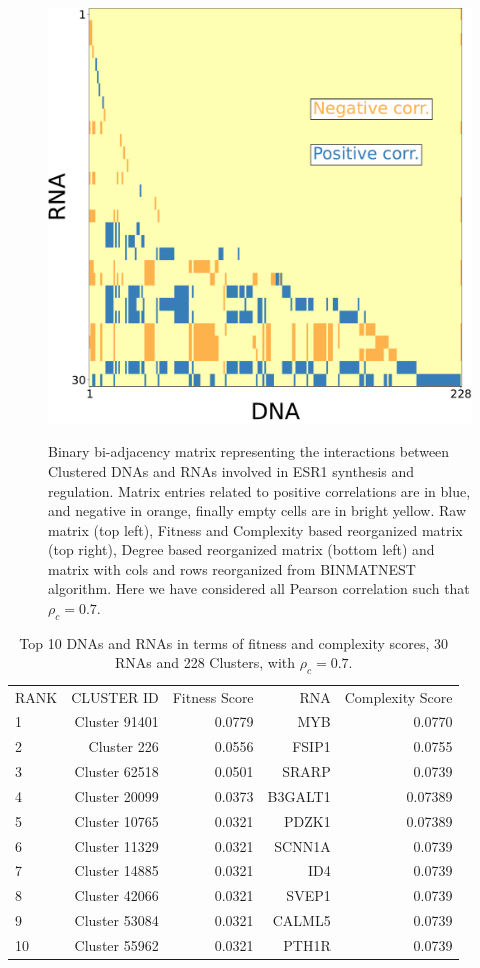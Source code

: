 \documentclass[10pt,a4paper]{article}
\begin{document}
\begin{figure}[h!]
\begin{center}
{\includegraphics[width=0.5\columnwidth]{FIG/ADN_c-ARN_BINMATNEST-ESR1-Matrix-sum-unit-0.7-PN.pdf}
}
\end{center}
\caption{\label{fig:fig1}Binary bi-adjacency matrix representing the interactions between Clustered DNAs and RNAs involved in ESR1 synthesis and regulation. Matrix entries related to positive correlations are in blue, and negative in orange, finally empty cells are in bright yellow. Raw matrix (top left), Fitness and Complexity based reorganized matrix (top right), Degree based reorganized matrix (bottom left) and matrix with cols and rows reorganized from BINMATNEST algorithm. Here we have considered all Pearson correlation such that $\rho_{c} = 0.7$.}
\end{figure}
 \begin{table}[h!]
\centering
\caption{\label{tab:tab1} Top 10 DNAs and RNAs in terms of fitness and complexity scores, 30 RNAs and 228 Clusters, with $\rho_{c} = 0.7$.}
\begin{tabular}{l|rr|rr|}
\cline{1-5}
RANK & CLUSTER ID & Fitness Score & RNA & Complexity Score\\
\cline{1-5}
1 & Cluster 91401 & 0.0779 & MYB & 0.0770\\
2 & Cluster 226 & 0.0556 & FSIP1 & 0.0755\\
3 & Cluster 62518 & 0.0501 & SRARP & 0.0739\\
4 & Cluster 20099 & 0.0373 & B3GALT1 & 0.07389\\
5 & Cluster 10765 & 0.0321 & PDZK1 & 0.07389\\
6 & Cluster 11329 & 0.0321 & SCNN1A & 0.0739\\
7 & Cluster 14885 & 0.0321 & ID4 & 0.0739\\
8 & Cluster 42066 & 0.0321 & SVEP1 & 0.0739\\
9 & Cluster 53084 & 0.0321 & CALML5 & 0.0739\\
10 & Cluster 55962 & 0.0321 & PTH1R & 0.0739\\
\cline{1-5}
\end{tabular}
\end{table}
\end{document}

